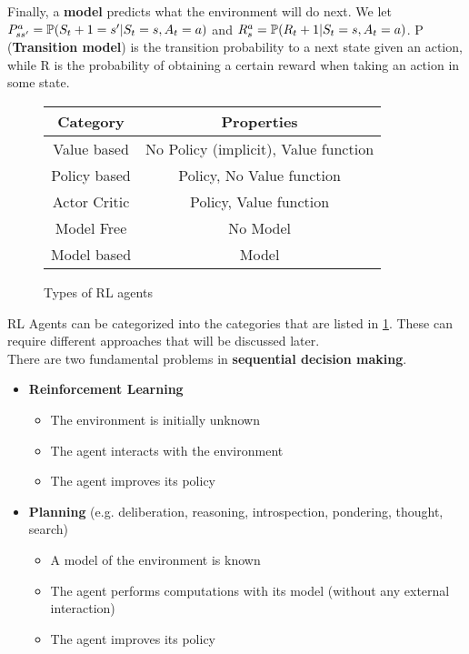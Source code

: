 Finally, a \textbf{model} predicts what the environment will do next. We let $P_{ss'}^a = \operatorname{\mathbb{P}}(S_t+1 = s' | S_t = s, A_t = a)$ and $R_{s}^a = \operatorname{\mathbb{P}}(R_t+1 | S_t = s, A_t = a)$. P (\textbf{Transition model}) is the transition probability to a next state given an action, while R is the probability of obtaining a certain reward when taking an action in some state.\\

\pagebreak

\begin{figure}[h]
	\centering
	\begin{tabular}{| c | c |}
		\hline
		Category & Properties\\
		\hline\hline
		Value based & No Policy (implicit), Value function\\
		\hline
		Policy based & Policy, No Value function\\
		\hline
		Actor Critic & Policy, Value function\\
		\hline
		Model Free & No Model\\
		\hline
		Model based & Model\\
		\hline
	\end{tabular}
	\caption{Types of RL agents}
	\label{tab:rl_agent_categories}
\end{figure}

RL Agents can be categorized into the categories that are listed in \ref{tab:rl_agent_categories}. These can require different approaches that will be discussed later.\\

There are two fundamental problems in \textbf{sequential decision making}.
\begin{itemize}
	\item \textbf{Reinforcement Learning} 
		\begin{itemize}
			\item The environment is initially unknown
			\item The agent interacts with the environment
			\item The agent improves its policy
		\end{itemize}
	\item \textbf{Planning} (e.g. deliberation, reasoning, introspection, pondering, thought, search)
		\begin{itemize}
			\item A model of the environment is known
			\item The agent performs computations with its model (without any external interaction)
			\item The agent improves its policy
		\end{itemize}
\end{itemize}

